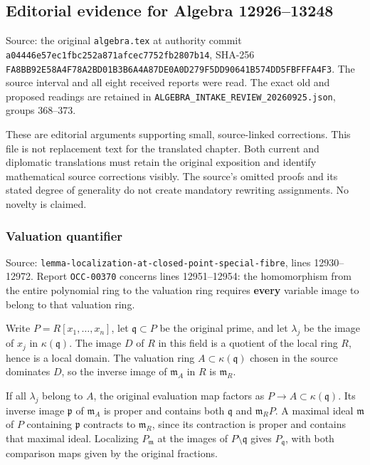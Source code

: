 \subsection{Editorial evidence for Algebra 12926--13248}\label{algebra-proof-001-editorial-evidence-for-algebra-1292613248}

Source: the original \texttt{algebra.tex} at authority commit \texttt{a04446e57ec1fbc252a871afcec7752fb2807b14}, SHA-256 \texttt{FA8BB92E58A4F78A2BD01B3B6A4A87DE0A0D279F5DD90641B574DD5FBFFFA4F3}. The source interval and all eight received reports were read. The exact old and proposed readings are retained in \texttt{ALGEBRA\_INTAKE\_REVIEW\_20260925.json}, groups 368--373.

These are editorial arguments supporting small, source-linked corrections. This file is not replacement text for the translated chapter. Both current and diplomatic translations must retain the original exposition and identify mathematical source corrections visibly. The source's omitted proofs and its stated degree of generality do not create mandatory rewriting assignments. No novelty is claimed.

\subsubsection{Valuation quantifier}\label{algebra-proof-001-valuation-quantifier}

Source: \texttt{lemma-localization-at-closed-point-special-fibre}, lines 12930--12972. Report \texttt{OCC-00370} concerns lines 12951--12954: the homomorphism from the entire polynomial ring to the valuation ring requires \textbf{every} variable image to belong to that valuation ring.

Write \(P=R[x_1,\ldots,x_n]\), let \(\mathfrak q\subset P\) be the original prime, and let \(\lambda_j\) be the image of \(x_j\) in \(\kappa(\mathfrak q)\). The image \(D\) of \(R\) in this field is a quotient of the local ring \(R\), hence is a local domain. The valuation ring \(A\subset\kappa(\mathfrak q)\) chosen in the source dominates \(D\), so the inverse image of \(\mathfrak m_A\) in \(R\) is \(\mathfrak m_R\).

If all \(\lambda_j\) belong to \(A\), the original evaluation map factors as \(P\to A\subset\kappa(\mathfrak q)\). Its inverse image \(\mathfrak p\) of \(\mathfrak m_A\) is proper and contains both \(\mathfrak q\) and \(\mathfrak m_RP\). A maximal ideal \(\mathfrak m\) of \(P\) containing \(\mathfrak p\) contracts to \(\mathfrak m_R\), since its contraction is proper and contains that maximal ideal. Localizing \(P_{\mathfrak m}\) at the images of \(P\setminus\mathfrak q\) gives \(P_{\mathfrak q}\), with both comparison maps given by the original fractions.

